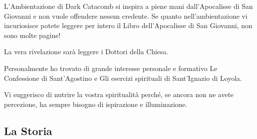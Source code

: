 \documentclass[12pt,a4paper,twoside,openany]{book}
\begin{document}

\begin{narratore}
L'Ambientazione di Dark Catacomb si inspira a piene mani dall'Apocalisse di San Giovanni e non vuole offendere nessun credente. Se quanto nell'ambientazione vi incuriosisce potete leggere per intero il Libro dell'Apocalisse di San Giovanni, non sono molte pagine!
	
La  vera rivelazione sarà leggere i Dottori della Chiesa.
	
Personalmente ho trovato di grande interesse personale e formativo Le Confessione di Sant'Agostino e Gli esercizi spirituali di Sant'Ignazio di Loyola.
	
Vi suggerisco di nutrire la vostra spiritualità perché, se ancora non ne avete percezione, ha sempre bisogno di ispirazione e illuminazione.
	
\end{narratore}	

\subsection{La Storia}
\end{document}
